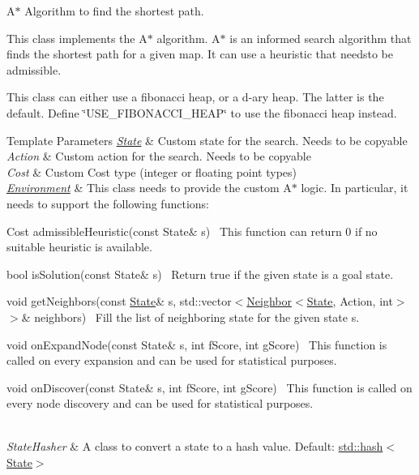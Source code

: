 A$\ast$ Algorithm to find the shortest path. 

This class implements the A$\ast$ algorithm. A$\ast$ is an informed search algorithm that finds the shortest path for a given map. It can use a heuristic that needsto be admissible.

This class can either use a fibonacci heap, or a d-\/ary heap. The latter is the default. Define \char`\"{}\+U\+S\+E\+\_\+\+F\+I\+B\+O\+N\+A\+C\+C\+I\+\_\+\+H\+E\+A\+P\char`\"{} to use the fibonacci heap instead.


\begin{DoxyTemplParams}{Template Parameters}
{\em \hyperlink{structlib_multi_robot_planning_1_1_state}{State}} & Custom state for the search. Needs to be copy\textquotesingle{}able \\
\hline
{\em Action} & Custom action for the search. Needs to be copy\textquotesingle{}able \\
\hline
{\em Cost} & Custom Cost type (integer or floating point types) \\
\hline
{\em \hyperlink{classlib_multi_robot_planning_1_1_environment}{Environment}} & This class needs to provide the custom A$\ast$ logic. In particular, it needs to support the following functions\+:
\begin{DoxyItemize}
\item {\ttfamily Cost admissible\+Heuristic(const State\& s)}~\newline
 This function can return 0 if no suitable heuristic is available.
\item {\ttfamily bool is\+Solution(const State\& s)}~\newline
 Return true if the given state is a goal state.
\item {\ttfamily void get\+Neighbors(const \hyperlink{structlib_multi_robot_planning_1_1_state}{State}\& s, std\+::vector$<$\hyperlink{structlib_multi_robot_planning_1_1_neighbor}{Neighbor}$<$\hyperlink{structlib_multi_robot_planning_1_1_state}{State}, Action, int$>$ $>$\& neighbors)}~\newline
 Fill the list of neighboring state for the given state s.
\item {\ttfamily void on\+Expand\+Node(const State\& s, int f\+Score, int g\+Score)}~\newline
 This function is called on every expansion and can be used for statistical purposes.
\item {\ttfamily void on\+Discover(const State\& s, int f\+Score, int g\+Score)}~\newline
 This function is called on every node discovery and can be used for statistical purposes.
\end{DoxyItemize}\\
\hline
{\em State\+Hasher} & A class to convert a state to a hash value. Default\+: \hyperlink{structstd_1_1hash_3_01_state_01_4}{std\+::hash$<$\+State$>$} \\
\hline
\end{DoxyTemplParams}



